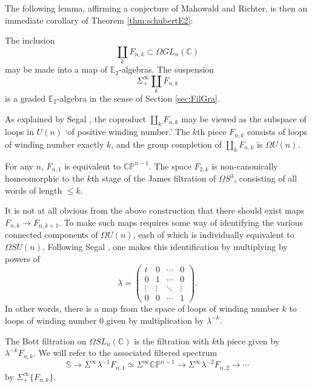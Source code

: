 The following lemma, affirming a conjecture of Mahowald and Richter, is then an immediate corollary of Theorem \ref{thm:schubertE2}:

\begin{lem}  
The inclusion 
$$\coprod_k F_{n,k} \subset \Omega GL_n(\mathbb{C})$$
may be made into a map of $\mathbb{E}_2$-algebras.  The suspension $$\Sigma^{\infty}_+ \coprod_k F_{n,k}$$ is a graded $\mathbb{E}_2$-algebra in the sense of Section \ref{sec:FilGra}.
\end{lem}

As explained by Segal \cite{Segal}, the coproduct $\coprod_k F_{n,k}$ may be viewed as the subspace of loops in $U(n)$ `of positive winding number.'  The $k$th piece $F_{n,k}$ consists of loops of winding number exactly $k$, and the group completion of $\coprod_k F_{n,k}$ is $\Omega U(n)$.

\begin{exm}
For any $n$, $F_{n,1}$ is equivalent to $\mathbb{CP}^{n-1}$.  The space $F_{2,k}$ is non-canonically homeomorphic to the $k$th stage of the James filtration of $\Omega S^3$, consisting of all words of length $\le k$.
\end{exm}

It is not at all obvious from the above construction that there should exist maps $F_{n,k} \rightarrow F_{n,k+1}$.  To make such maps requires some way of identifying the various connected components of $\Omega U(n)$, each of which is individually equivalent to $\Omega SU(n)$.  Following Segal \cite[pg. 3--4]{Segal}, one makes this identification by multiplying by powers of 
$$\lambda = \left( \begin{array}{cccc} t & 0 & \cdots & 0 \\ 0 & 1 & \cdots & 0 \\ \vdots & \vdots & \ddots & \vdots \\ 0 & 0 & \cdots & 1 \end{array} \right).$$
In other words, there is a map from the space of loops of winding number $k$ to loops of winding number $0$ given by multiplication by $\lambda^{-k}$.

\begin{dfn}
The Bott filtration on $\Omega SL_n(\mathbb{C})$ is the filtration with $k$th piece given by $\lambda^{-k} F_{n,k}$.  We will refer to the associated filtered spectrum 
$$\mathbb{S} \rightarrow \Sigma^{\infty} \lambda^{-1} F_{n,1} \simeq \Sigma^{\infty} \mathbb{CP}^{n-1} \rightarrow \Sigma^{\infty} \lambda^{-2} F_{n,2} \rightarrow \cdots$$
by $\Sigma^{\infty}_+ \{F_{n,k}\}$.
\end{dfn}


